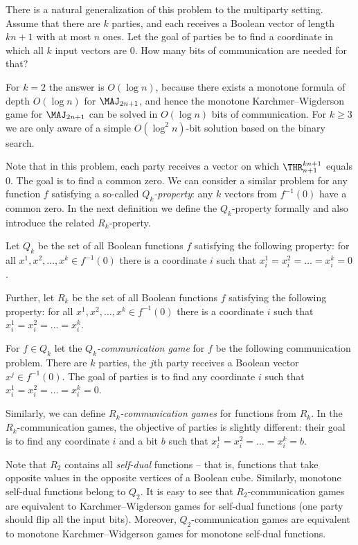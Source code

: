 There is a natural generalization of this problem to the multiparty setting.
%
Assume that there are $k$ parties, and each receives a Boolean vector of length $kn + 1$ with at most $n$ ones. Let the goal of parties be to find a coordinate in which all $k$ input vectors are $0$. How many bits of communication are needed for that?

For $k = 2$ the answer is $O(\log n)$, because there exists 
%
a monotone formula of depth $O(\log n)$  %
for $\MAJ_{2n + 1}$, and hence the monotone Karchmer--Wigderson game for $\MAJ_{2n + 1}$ can be solved in $O(\log n)$ bits of communication. For $k \ge 3$ we are only aware of a simple $O(\log^2 n)$-bit solution based on the binary search.

Note that in this problem, each party receives a vector on which $\THR^{kn + 1}_{n + 1}$ equals $0$. The goal is to find a common zero.  We can consider a similar problem for any function $f$ satisfying a so-called \emph{$Q_k$-property}: any $k$ vectors from $f^{-1}(0)$ have a common zero. In the next definition we define the $Q_k$-property formally and also introduce the related $R_k$-property.



\begin{definition}
Let $Q_k$ be the set of all Boolean functions $f$ satisfying the following property: for all $x^1, x^2, \ldots, x^k\in f^{-1}(0)$ there is a coordinate $i$ such that $x^1_i = x^2_i = \ldots =  x^k_i = 0$.

Further, let $R_k$ be the set of all Boolean functions $f$  satisfying the following property: for all $x^1, x^2, \ldots, x^k\in f^{-1}(0)$ there is a coordinate $i$ such that $x^1_i = x^2_i = \ldots =  x^k_i$.
\end{definition}



For $f\in Q_k$ let the \emph{$Q_k$-communication game} for $f$  be the following communication problem. There are $k$ parties, the $j$th party receives a Boolean vector $x^j\in f^{-1}(0)$. The goal of parties is to find any coordinate $i$ such that $x^1_i = x^2_i = \ldots = x^k_i = 0$.

Similarly, we can define \emph{$R_k$-communication games} for functions from $R_k$. In the $R_k$-commu\-ni\-ca\-tion %
%
games, the objective of parties is slightly different: their goal is to find any coordinate $i$  and a bit $b$ such that $x^1_i = x^2_i = \ldots = x^k_i = b$.

Note that $R_2$ contains all \emph{self-dual} functions -- that is, functions that take opposite values in the opposite vertices of a Boolean cube.
Similarly, monotone self-dual functions belong to $Q_2$. It is easy to see that $R_2$-communication games are equivalent to Karchmer--Wigderson games for self-dual functions (one party should flip all the input bits). Moreover, $Q_2$-communication games are equivalent to monotone Karchmer--Widgerson games for monotone self-dual functions. 

